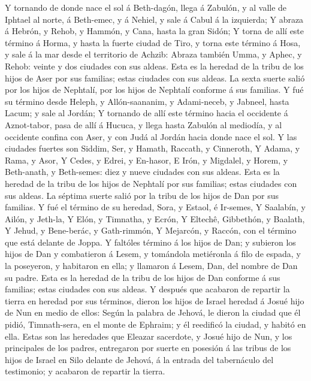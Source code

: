  Y tornando de donde nace el sol á Beth-dagón, llega á
Zabulón, y al valle de Iphtael al norte, á Beth-emec, y á Nehiel, y sale
á Cabul á la izquierda;  Y abraza á Hebrón, y Rehob, y
Hammón, y Cana, hasta la gran Sidón;  Y torna de allí
este término á Horma, y hasta la fuerte ciudad de Tiro, y torna este
término á Hosa, y sale á la mar desde el territorio de Achzib:
 Abraza también Umma, y Aphec, y Rehob: veinte y dos
ciudades con sus aldeas.  Esta es la heredad de la tribu
de los hijos de Aser por sus familias; estas ciudades con sus aldeas.
 La sexta suerte salió por los hijos de Nephtalí, por los
hijos de Nephtalí conforme á sus familias.  Y fué su
término desde Heleph, y Allón-saananim, y Adami-neceb, y Jabneel, hasta
Lacum; y sale al Jordán;  Y tornando de allí este término
hacia el occidente á Aznot-tabor, pasa de allí á Hucuca, y llega hasta
Zabulón al mediodía, y al occidente confina con Aser, y con Judá al
Jordán hacia donde nace el sol.  Y las ciudades fuertes
son Siddim, Ser, y Hamath, Raccath, y Cinneroth,  Y
Adama, y Rama, y Asor,  Y Cedes, y Edrei, y En-hasor,
 E Irón, y Migdalel, y Horem, y Beth-anath, y Beth-semes:
diez y nueve ciudades con sus aldeas.  Esta es la heredad
de la tribu de los hijos de Nephtalí por sus familias; estas ciudades
con sus aldeas.  La séptima suerte salió por la tribu de
los hijos de Dan por sus familias.  Y fué el término de
su heredad, Sora, y Estaol, é Ir-semes,  Y Saalabín, y
Ailón, y Jeth-la,  Y Elón, y Timnatha, y Ecrón,
 Y Eltechê, Gibbethón, y Baalath,  Y
Jehud, y Bene-berác, y Gath-rimmón,  Y Mejarcón, y
Raccón, con el término que está delante de Joppa.  Y
faltóles término á los hijos de Dan; y subieron los hijos de Dan y
combatieron á Lesem, y tomándola metiéronla á filo de espada, y la
poseyeron, y habitaron en ella; y llamaron á Lesem, Dan, del nombre de
Dan su padre.  Esta es la heredad de la tribu de los
hijos de Dan conforme á sus familias; estas ciudades con sus aldeas.
 Y después que acabaron de repartir la tierra en heredad
por sus términos, dieron los hijos de Israel heredad á Josué hijo de Nun
en medio de ellos:  Según la palabra de Jehová, le dieron
la ciudad que él pidió, Timnath-sera, en el monte de Ephraim; y él
reedificó la ciudad, y habitó en ella.  Estas son las
heredades que Eleazar sacerdote, y Josué hijo de Nun, y los principales
de los padres, entregaron por suerte en posesión á las tribus de los
hijos de Israel en Silo delante de Jehová, á la entrada del tabernáculo
del testimonio; y acabaron de repartir la tierra.

